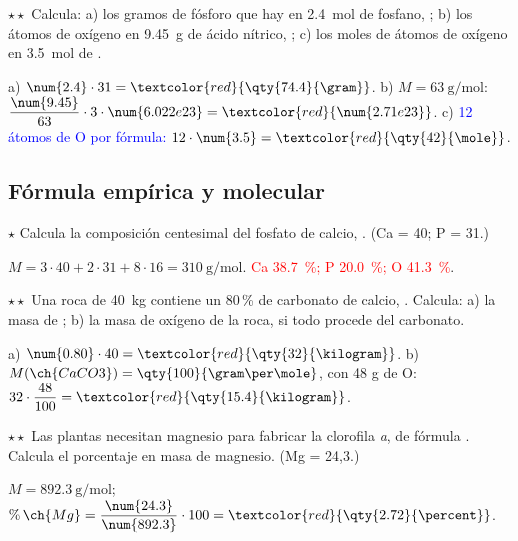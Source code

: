 \begin{exercise}
    \(\star\star\) Calcula: a) los gramos de fósforo que hay en \qty{2.4}{\mole} de fosfano, ; b) los átomos de oxígeno en
    \qty{9.45}{\gram} de ácido nítrico, ; c) los moles de átomos de oxígeno en \qty{3.5}{\mole} de .
    \begin{solu}
        a) \(\num{2.4} \cdot 31 = \textcolor{red}{\qty{74.4}{\gram}}\). b) \(M = \qty{63}{\gram\per\mole}\): \(\dfrac{\num{9.45}}{63} \cdot 3 \cdot \num{6.022e23} =
        \textcolor{red}{\num{2.71e23}}\). c) \textcolor{blue}{12 átomos de O por fórmula:} \(12 \cdot \num{3.5} = \textcolor{red}{\qty{42}{\mole}}\).
    \end{solu}
\end{exercise}

\subsection{Fórmula empírica y molecular}

\begin{exercise}
    \(\star\) Calcula la composición centesimal del fosfato de calcio, . (Ca = 40; P = 31.)
    \begin{solu}
        \(M = 3 \cdot 40 + 2 \cdot 31 + 8 \cdot 16 = \qty{310}{\gram\per\mole}\).
        \textcolor{red}{Ca \qty{38.7}{\percent}; P \qty{20.0}{\percent}; O \qty{41.3}{\percent}}.
    \end{solu}
\end{exercise}

\begin{exercise}
    \(\star\star\) Una roca de \qty{40}{\kilogram} contiene un 80\,\% de carbonato de calcio, . Calcula: a) la masa de
    ; b) la masa de oxígeno de la roca, si todo procede del carbonato.
    \begin{solu}
        a) \(\num{0.80} \cdot 40 = \textcolor{red}{\qty{32}{\kilogram}}\). b) \(M(\ch{CaCO3}) = \qty{100}{\gram\per\mole}\), con 48 g de O:
        \(32 \cdot \dfrac{48}{100} = \textcolor{red}{\qty{15.4}{\kilogram}}\).
    \end{solu}
\end{exercise}

\begin{exercise}
    \(\star\star\) Las plantas necesitan magnesio para fabricar la clorofila \textit{a}, de fórmula . Calcula el
    porcentaje en masa de magnesio. (Mg = 24,3.)
    \begin{solu}
        \(M = \qty{892.3}{\gram\per\mole}\); \(\%\,\ch{Mg} = \dfrac{\num{24.3}}{\num{892.3}} \cdot 100 = \textcolor{red}{\qty{2.72}{\percent}}\).
    \end{solu}
\end{exercise}


